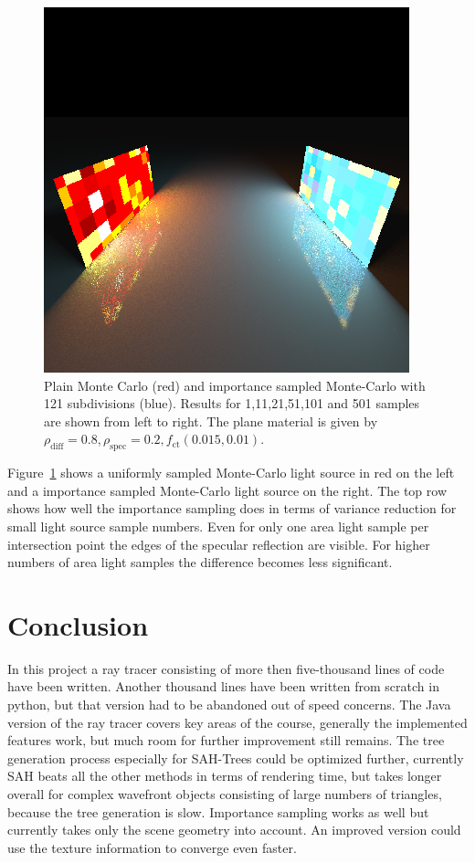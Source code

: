 \begin{figure}
\includegraphics[width=0.3\linewidth]{./img/twoAI/501}
\caption{Plain Monte Carlo (red) and importance sampled Monte-Carlo with 121 subdivisions (blue). Results for 1,11,21,51,101 and 501 samples are shown from left to right. The plane material is given by $\rho_{\text{diff}} = 0.8,  \rho_{\text{spec}} = 0.2, f_{\text{ct}}(0.015,0.01)$.}
\label{fig:twoLight}
\end{figure}

Figure~\ref{fig:twoLight} shows a uniformly sampled Monte-Carlo light source in red on the left and a importance sampled Monte-Carlo light source on the right. The top row shows how well the importance sampling does in terms of variance reduction for small light source sample numbers. Even for only one area light sample per intersection point the edges of the specular reflection are visible. For higher numbers of area light samples the difference becomes less significant.

\section{Conclusion}
In this project a ray tracer consisting of more then five-thousand lines of code have been written. Another thousand lines have been written from scratch in python, but that version had to be abandoned out of speed concerns. The Java version of the ray tracer covers key areas of the course, generally the implemented features work, but much room for further improvement still remains. The tree generation process especially for SAH-Trees could be optimized further, currently SAH beats all the other methods in terms of rendering time, but takes longer overall for complex wavefront objects consisting of large numbers of triangles, because the tree generation is slow.  Importance sampling works as well but currently takes only the scene geometry into account. An improved version could use the texture information to converge even faster. 



